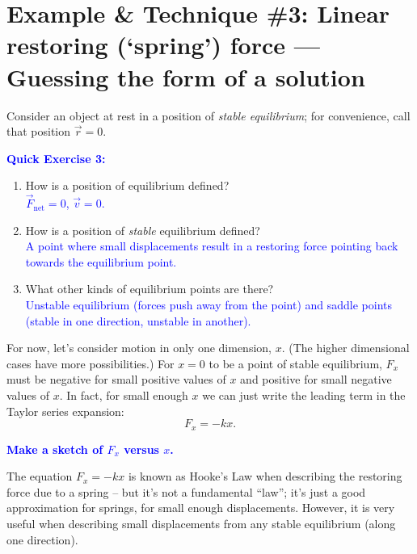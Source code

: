 \documentclass[11pt, letterpaper, openany]{book}
\begin{document}
\section*{Example \& Technique \#3: Linear restoring (`spring') force --- Guessing the form of a solution}

Consider an object at rest in a position of \textit{stable equilibrium}; for convenience, call that position $\vec{r} = 0$.

\textcolor{blue}{\textbf{Quick Exercise 3:}}
\begin{enumerate}[label=(\alph*)]
    \item How is a position of equilibrium defined? \\
    \textcolor{blue}{$\vec{F}_{\text{net}} = 0$, $\vec{v} = 0$.}
    \item How is a position of \textit{stable} equilibrium defined? \\
    \textcolor{blue}{A point where small displacements result in a restoring force pointing back towards the equilibrium point.}
    \item What other kinds of equilibrium points are there? \\
    \textcolor{blue}{Unstable equilibrium (forces push away from the point) and saddle points (stable in one direction, unstable in another).}
\end{enumerate}

For now, let's consider motion in only one dimension, $x$. (The higher dimensional cases have more possibilities.) For $x = 0$ to be a point of stable equilibrium, $F_x$ must be negative for small positive values of $x$ and positive for small negative values of $x$. In fact, for small enough $x$ we can just write the leading term in the Taylor series expansion:
\[ F_x = -kx. \]

\textcolor{blue}{\textbf{Make a sketch of $F_x$ versus $x$.}}
\begin{center}
\end{center}

The equation $F_x = -kx$ is known as Hooke's Law when describing the restoring force due to a spring -- but it's not a fundamental ``law''; it's just a good approximation for springs, for small enough displacements. However, it is very useful when describing small displacements from any stable equilibrium (along one direction).
\end{document}
